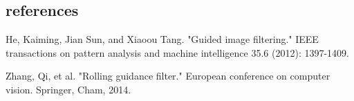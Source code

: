 \documentclass[extendedabs]{bmvc2k}
\begin{document}
\subsection*{references}

\begin{thebibliography}{9}
    He, Kaiming, Jian Sun, and Xiaoou Tang. "Guided image filtering." 
    IEEE transactions on pattern analysis and machine intelligence 35.6 (2012): 1397-1409.
    
    Zhang, Qi, et al. "Rolling guidance filter." European conference on computer vision. Springer, Cham, 2014.
\end{thebibliography}
\end{document}
